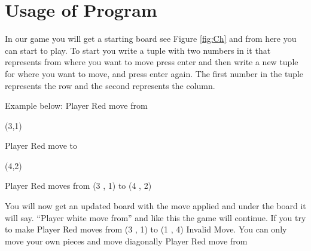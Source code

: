 \documentclass[12pt,a4paper]{article}
\begin{document}
\section{Usage of Program}
In our game you will get a starting board see Figure \ref{fig:Ch} and from here you can start to play. To start you write a tuple with two numbers in it that represents from where you want to move press enter and then write a new tuple for where you want to move, and press enter again. The first number in the tuple represents the row and the second represents the column.

Example below:
Player Red move from

(3,1)

Player Red move to

(4,2)

Player Red moves from  (3 , 1)  to  (4 , 2)

You will now get an updated board with the move applied and under the board it will say. “Player white move from” and like this the game will continue. If you try to make 
Player Red moves from  (3 , 1)  to  (1 , 4)
Invalid Move. You can only move your own pieces and move diagonally
Player Red move from
\end{document}
